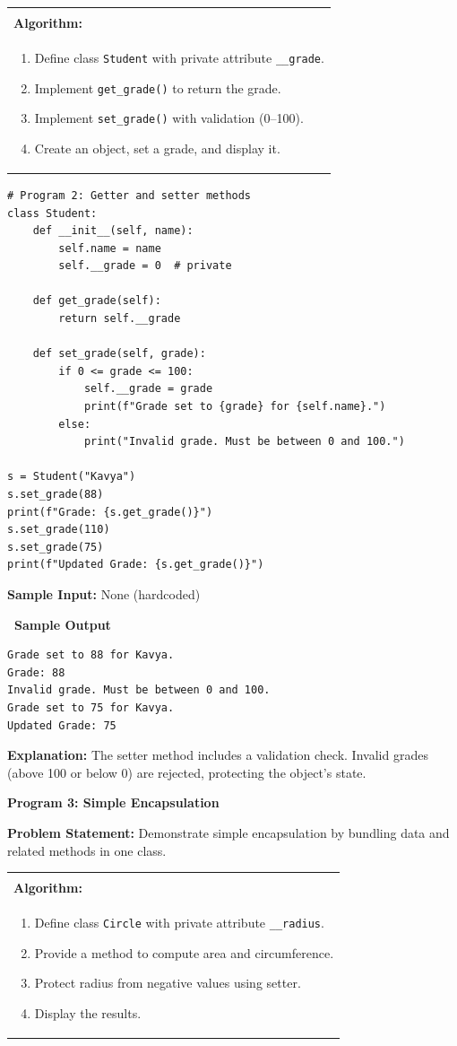 \documentclass[12pt,a4paper]{article}
\makeatletter
\newcommand{\outhead}{\noindent\colorbox{cmrgreen!25}%
  {\textbf{\small\color{cmrdark}~Sample Output~}}\par\vspace{-1pt}}
\newenvironment{algobox}{%
  \par\vspace{4pt}%
  \noindent\begin{tabular}{@{}p{\linewidth}@{}}%
  \hline\\[-8pt]%
  \textbf{\color{blue!60!black}\small Algorithm:}\\[2pt]%
}{%
  \\[-4pt]\hline%
  \end{tabular}\par\vspace{4pt}%
}
\makeatother
\begin{document}
\begin{algobox}
\begin{enumerate}[label=Step \arabic*:]
  \item Define class \texttt{Student} with private attribute \texttt{\_\_grade}.
  \item Implement \texttt{get\_grade()} to return the grade.
  \item Implement \texttt{set\_grade()} with validation (0--100).
  \item Create an object, set a grade, and display it.
\end{enumerate}
\end{algobox}

\begin{lstlisting}
# Program 2: Getter and setter methods
class Student:
    def __init__(self, name):
        self.name = name
        self.__grade = 0  # private

    def get_grade(self):
        return self.__grade

    def set_grade(self, grade):
        if 0 <= grade <= 100:
            self.__grade = grade
            print(f"Grade set to {grade} for {self.name}.")
        else:
            print("Invalid grade. Must be between 0 and 100.")

s = Student("Kavya")
s.set_grade(88)
print(f"Grade: {s.get_grade()}")
s.set_grade(110)
s.set_grade(75)
print(f"Updated Grade: {s.get_grade()}")
\end{lstlisting}

\textbf{Sample Input:} None (hardcoded)

\outhead
\begin{lstlisting}[style=outputstyle]
Grade set to 88 for Kavya.
Grade: 88
Invalid grade. Must be between 0 and 100.
Grade set to 75 for Kavya.
Updated Grade: 75
\end{lstlisting}

\textbf{Explanation:} The setter method includes a validation check. Invalid grades (above 100 or below 0) are rejected, protecting the object's state.

\vspace{0.5cm}

\textbf{Program 3: Simple Encapsulation}

\textbf{Problem Statement:}
Demonstrate simple encapsulation by bundling data and related methods in one class.

\begin{algobox}
\begin{enumerate}[label=Step \arabic*:]
  \item Define class \texttt{Circle} with private attribute \texttt{\_\_radius}.
  \item Provide a method to compute area and circumference.
  \item Protect radius from negative values using setter.
  \item Display the results.
\end{enumerate}
\end{algobox}
\end{document}

